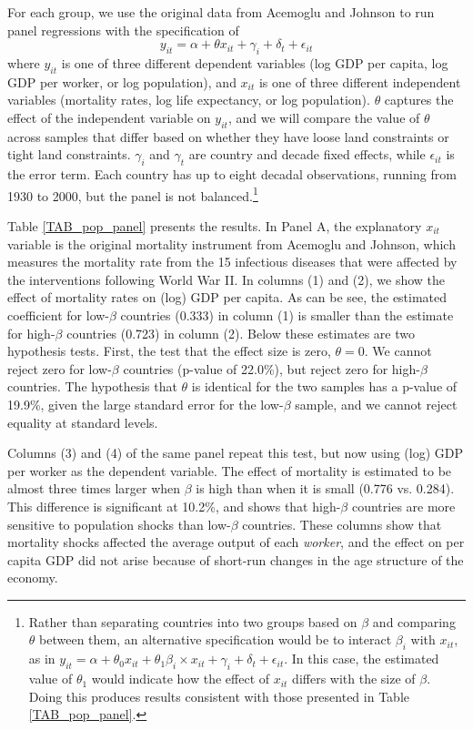 \documentclass[11pt]{article}
\begin{document}
For each group, we use the original data from Acemoglu and Johnson to run panel regressions with the specification of
\begin{equation}
    y_{it} = \alpha + \theta x_{it} + \gamma_i + \delta_t + \epsilon_{it}
\end{equation}
where $y_{it}$ is one of three different dependent variables (log GDP per capita, log GDP per worker, or log population), and $x_{it}$ is one of three different independent variables (mortality rates, log life expectancy, or log population). $\theta$ captures the effect of the independent variable on $y_{it}$, and we will compare the value of $\theta$ across samples that differ based on whether they have loose land constraints or tight land constraints. $\gamma_i$ and $\gamma_t$ are country and decade fixed effects, while $\epsilon_{it}$ is the error term. Each country has up to eight decadal observations, running from 1930 to 2000, but the panel is not balanced.\footnote{Rather than separating countries into two groups based on $\beta$ and comparing $\theta$ between them, an alternative specification would be to interact $\beta_i$ with $x_{it}$, as in $y_{it} = \alpha + \theta_0 x_{it} + \theta_1 \beta_i \times x_{it} + \gamma_i + \delta_t + \epsilon_{it}$. In this case, the estimated value of $\theta_1$ would indicate how the effect of $x_{it}$ differs with the size of $\beta$. Doing this produces results consistent with those presented in Table \ref{TAB_pop_panel}.}

Table \ref{TAB_pop_panel} presents the results. In Panel A, the explanatory $x_{it}$ variable is the original mortality instrument from Acemoglu and Johnson, which measures the mortality rate from the 15 infectious diseases that were affected by the interventions following World War II. In columns (1) and (2), we show the effect of mortality rates on (log) GDP per capita. As can be see, the estimated coefficient for low-$\beta$ countries (0.333) in column (1) is smaller than the estimate for high-$\beta$ countries (0.723) in column (2). Below these estimates are two hypothesis tests. First, the test that the effect size is zero, $\theta=0$. We cannot reject zero for low-$\beta$ countries (p-value of 22.0\%), but reject zero for high-$\beta$ countries. The hypothesis that $\theta$ is identical for the two samples has a p-value of 19.9\%, given the large standard error for the low-$\beta$ sample, and we cannot reject equality at standard levels.

Columns (3) and (4) of the same panel repeat this test, but now using (log) GDP per worker as the dependent variable. The effect of mortality is estimated to be almost three times larger when $\beta$ is high than when it is small (0.776 vs. 0.284). This difference is significant at 10.2\%, and shows that high-$\beta$ countries are more sensitive to population shocks than low-$\beta$ countries. These columns show that mortality shocks affected the average output of each \textit{worker}, and the effect on per capita GDP did not arise because of short-run changes in the age structure of the economy.
\end{document}
